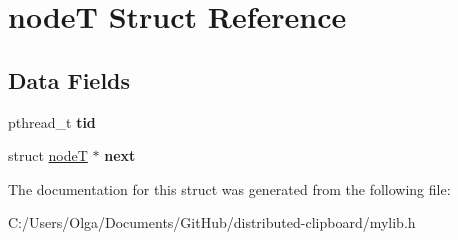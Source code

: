 \hypertarget{structnode_t}{}\section{nodeT Struct Reference}
\label{structnode_t}
\subsection*{Data Fields}
\begin{DoxyCompactItemize}
\item 
\mbox{\label{structnode_t_a3a5ba243b3ab4b6093afb178de0f9509}} 
pthread\+\_\+t {\bfseries tid}
\item 
\mbox{\label{structnode_t_a583a4a98fe2e5fb384e371f1c184baac}} 
struct \mbox{\hyperlink{structnode_t}{nodeT}} $\ast$ {\bfseries next}
\end{DoxyCompactItemize}


The documentation for this struct was generated from the following file\+:\begin{DoxyCompactItemize}
\item 
C\+:/\+Users/\+Olga/\+Documents/\+Git\+Hub/distributed-\/clipboard/mylib.\+h\end{DoxyCompactItemize}

